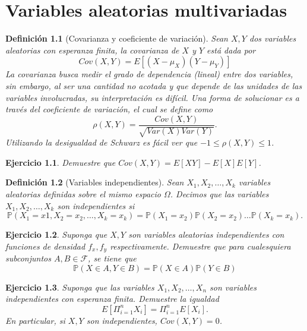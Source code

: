 \documentclass[11pt]{report}
\theoremstyle{break}
\newtheorem{definicion}{Definición}[chapter]
\newtheorem{ejercicio}{Ejercicio}[chapter]
\theoremstyle{break}
\begin{document}
\chapter{Variables aleatorias multivariadas}
\label{capitulo:variables aleatorias multivariadas}
\begin{definicion}[Covarianza y coeficiente de variación]
\label{definicion:covarianza}
Sean $X,Y$ dos variables aleatorias con esperanza finita, la covarianza de $X$ y $Y$ está dada por
$$
Cov(X,Y) = E[(X - \mu_{X})(Y - \mu_{Y})]
$$
La covarianza busca medir el grado de dependencia (lineal) entre dos variables, sin embargo, al ser una cantidad no acotada y que depende de las unidades de las variables involucradas, su interpretación es difícil. Una forma de solucionar es a través del coeficiente de variación, el cual se define como
$$
\rho(X,Y) = \dfrac{ Cov(X,Y)  }{ \sqrt{Var(X) Var(Y)} }.
$$
Utilizando la desigualdad de Schwarz es fácil ver que $-1\leq \rho(X,Y) \leq 1$.
\end{definicion}


\begin{ejercicio}
Demuestre que $Cov(X,Y) = E[XY] - E[X]E[Y]$.
\end{ejercicio}

\begin{definicion}[Variables independientes]
Sean $X_1, X_2,\ldots,X_k$ variables aleatorias definidas sobre el mismo espacio $\Omega$. Decimos que las variables $X_1, X_2,\ldots,X_k$ son independientes si
$$
\mathbb{P}(X_1 = x1, X_2 = x_2, \ldots, X_k = x_k) = \mathbb{P}(X_1 = x_2)\mathbb{P}(X_2 = x_2)\ldots\mathbb{P}(X_k = x_k).
$$
\end{definicion}

\begin{ejercicio}
Suponga que $X,Y$ son variables aleatorias independientes con funciones de densidad $f_x, f_y$ respectivamente. Demuestre que para cualesquiera subconjuntos $A,B \in \mathcal{F}$, se tiene que
$$
\mathbb{P}(X \in A, Y \in B) = \mathbb{P}(X \in A)\mathbb{P}(Y \in B)
$$
\end{ejercicio}

\begin{ejercicio}
Suponga que las variables $X_1, X_2, \ldots, X_n$ son variables independientes con esperanza finita. Demuestre la igualdad
$$
E[\Pi_{i=1}^{n}X_i] = \Pi_{i=1}^{n}E[X_i].
$$
En particular, si $X,Y$ son independientes, $Cov(X,Y) = 0$.
\end{ejercicio}
\end{document}
